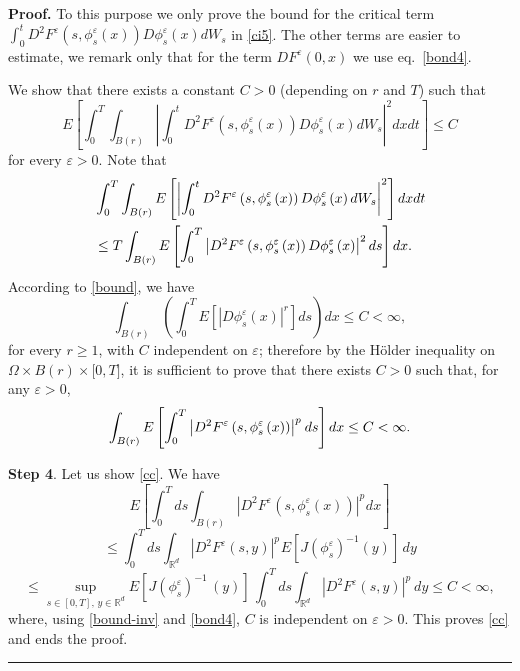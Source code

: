 \documentclass[a4paper,11pt]{article}
\newenvironment{proof}[1][Proof]{\textbf{#1.} }{\ \rule{0.5em}{0.5em}}
\newcommand{\RR}{\mathbb{R}}
\newcommand{\eps}{\varepsilon}
\begin{document}
\begin{proof}
To this purpose we only prove the bound for  the critical term
$\int_{0}^{t}D^{2}F^{\varepsilon }(s,{\phi }
 _{s}^{\eps}(x)) D{\phi
}_{s}^{\varepsilon }\left( x\right) dW_{s}$ in \eqref{ci5}.
 The other terms are easier to estimate, we remark only that for the term $DF^{\varepsilon}(  0,x)  $ we use eq.~\eqref{bond4}.

We show  that  there exists  a constant $C>0$ (depending on $r$
 and $T$)
 such that
\begin{equation}
E\left[ \int_{0}^{T}\int_{B(r)}\left|
\int_{0}^{t}D^{2}F^{\varepsilon }\left( s,{\phi }_{s}^{\eps}\left(
x\right) \right) D{\phi }_{s}^{\eps}\left( x\right) dW_{s}\right|
^{2}dxdt\right] \leq C  \label{cia}
\end{equation}
for every $\varepsilon >0$. Note that
\begin{align*}
& \int_{0}^{T}\int_{B(r)}E\left[ \left|
\int_{0}^{t}D^{2}F^{\varepsilon }\left( s,{\phi }_{s}^{\eps}\left(
x\right) \right) D{\phi }_{s}^{\eps}\left( x\right)
dW_{s}\right| ^{2}\right] dxdt \\
&
\leq T\int_{B(r)}E\left[ \int_{0}^{T}\left| D^{2}F^{\varepsilon }\left( s,{%
\phi }_{s}^{\eps}
 \left( x\right) \right) D{\phi }_{s}^{\eps}\left( x\right) \right| ^{2}ds%
\right] dx.
\end{align*}
According to \eqref{bound}, we have
\begin{equation*}
\int_{B(r)}\left( \int_{0}^{T}E\left[ \left| D{\phi
}_{s}^{\eps}\left( x\right) \right| ^{r}\right] ds\right) dx \le C <
\infty ,
\end{equation*}
 for every $r\geq 1$, with $C$ independent on
 $\eps$;
 therefore  by the H\"{o}lder inequality on $%
\Omega \times B(r)\times \lbrack 0,T]$, it is sufficient to prove
that there exists $C >0$ such that, for any $\eps>0$,
\begin{equation} \label{cc}
\int_{B(r)}E\left[ \int_{0}^{T}\left| D^{2}F^{\varepsilon }\left( s,{%
\phi }_{s}^{\eps}\left( x\right) \right) \right| ^{p^{ }}ds  \right]
dx \le C <\infty .
\end{equation}

\textbf{Step 4}. Let us show \eqref{cc}. We have
$$E\left[  \int_{0}^{T} ds\int_{B(r)}\left| D^{2}F^{\varepsilon }\left( s,%
{\phi }_{s}^{\eps}\left( x\right) \right) \right| ^{p^{ }}dx \right]
$$
$$ \le   \int_{0}^{T} ds\int_{\RR^d}\left|
D^{2}F^{\varepsilon }\left( s,{y}\right) \right| ^{p^{ }} E [J(\phi
_{s}^{\eps})^{-1}(y)] \, dy
$$ $$\leq \sup_{s \in [0,T] , \, y \in \RR^d}
   E[ J (\phi_s^{\eps})^{-1}\, (y)]
\, \int_{0}^{T} ds\int_{\RR^d}\left| D^{2}F^{\varepsilon }\left(
s,{y}\right) \right| ^{p^{ }} \,  dy \le C < \infty,
$$
where, using  \eqref{bound-inv} and  \eqref{bond4}, $C$ is
independent on $\eps>0.$ This proves \eqref{cc} and ends the proof.
\end{proof}
\end{document}
